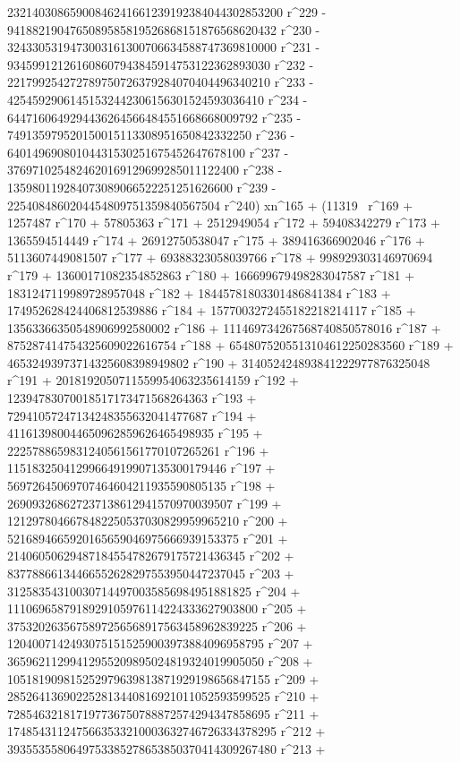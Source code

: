        23214030865900846241661239192384044302853200 r^229 - 
       9418821904765089585819526868151876568620432 r^230 - 
       3243305319473003161300706634588747369810000 r^231 - 
       934599121261608607943845914753122362893030 r^232 - 
       221799254272789750726379284070404496340210 r^233 - 
       42545929061451532442306156301524593036410 r^234 - 
       6447160649294436264566484551668668009792 r^235 - 
       749135979520150015113308951650842332250 r^236 - 
       64014969080104431530251675452647678100 r^237 - 
       3769710254824620169129699285011122400 r^238 - 
       135980119284073089066522251251626600 r^239 - 
       2254084860204454809751359840567504 r^240) xn^165 + (11319 \
r^169 + 1257487 r^170 + 57805363 r^171 + 2512949054 r^172 + 
       59408342279 r^173 + 1365594514449 r^174 + 
       26912750538047 r^175 + 389416366902046 r^176 + 
       5113607449081507 r^177 + 69388323058039766 r^178 + 
       998929303146970694 r^179 + 13600171082354852863 r^180 + 
       166699679498283047587 r^181 + 1831247119989728957048 r^182 + 
       18445781803301486841384 r^183 + 
       174952628424406812539886 r^184 + 
       1577003272455182218214117 r^185 + 
       13563366350548906992580002 r^186 + 
       111469734267568740850578016 r^187 + 
       875287414754325609022616754 r^188 + 
       6548075205513104612250283560 r^189 + 
       46532493973714325608398949802 r^190 + 
       314052424893841222977876325048 r^191 + 
       2018192050711559954063235614159 r^192 + 
       12394783070018517173471568264363 r^193 + 
       72941057247134248355632041477687 r^194 + 
       411613980044650962859626465498935 r^195 + 
       2225788659831240561561770107265261 r^196 + 
       11518325041299664919907135300179446 r^197 + 
       56972645069707464604211935590805135 r^198 + 
       269093268627237138612941570970039507 r^199 + 
       1212978046678482250537030829959965210 r^200 + 
       5216894665920165659046975666939153375 r^201 + 
       21406050629487184554782679175721436345 r^202 + 
       83778866134466552628297553950447237045 r^203 + 
       312583543100307144970035856984951881825 r^204 + 
       1110696587918929105976114224333627903800 r^205 + 
       3753202635675897256568917563458962839225 r^206 + 
       12040071424930751515259003973884096958795 r^207 + 
       36596211299412955209895024819324019905050 r^208 + 
       105181909815252979639813871929198656847155 r^209 + 
       285264136902252813440816921011052593599525 r^210 + 
       728546321817197736750788872574294347858695 r^211 + 
       1748543112475663533210003632746726334378295 r^212 + 
       3935535580649753385278653850370414309267480 r^213 + 
